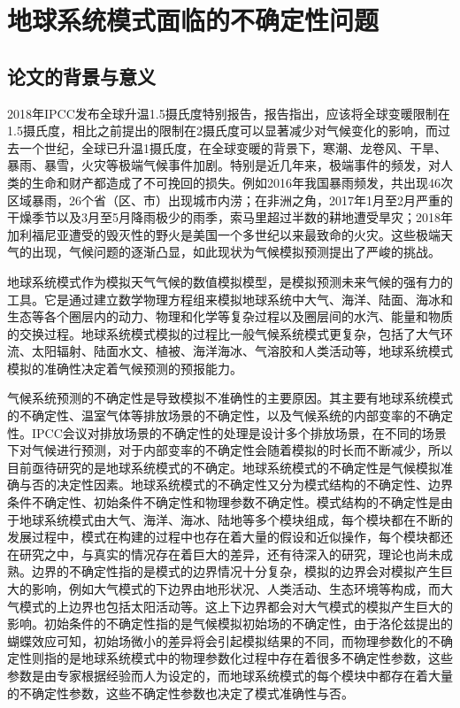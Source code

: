 \chapter{地球系统模式面临的不确定性问题}
\label{cha:intro}

\section{论文的背景与意义}
2018年IPCC发布全球升温1.5摄氏度特别报告，报告指出，应该将全球变暖限制在1.5摄氏度，相比之前提出的限制在2摄氏度可以显著减少对气候变化的影响，而过去一个世纪，全球已升温1摄氏度，在全球变暖的背景下，寒潮、龙卷风、干旱、暴雨、暴雪，火灾等极端气候事件加剧。特别是近几年来，极端事件的频发，对人类的生命和财产都造成了不可挽回的损失。例如2016年我国暴雨频发，共出现46次区域暴雨，26个省（区、市）出现城市内涝；在非洲之角，2017年1月至2月严重的干燥季节以及3月至5月降雨极少的雨季，索马里超过半数的耕地遭受旱灾；2018年加利福尼亚遭受的毁灭性的野火是美国一个多世纪以来最致命的火灾。这些极端天气的出现，气候问题的逐渐凸显，如此现状为气候模拟预测提出了严峻的挑战。

地球系统模式作为模拟天气气候的数值模拟模型，是模拟预测未来气候的强有力的工具。它是通过建立数学物理方程组来模拟地球系统中大气、海洋、陆面、海冰和生态等各个圈层内的动力、物理和化学等复杂过程以及圈层间的水汽、能量和物质的交换过程。地球系统模式模拟的过程比一般气候系统模式更复杂，包括了大气环流、太阳辐射、陆面水文、植被、海洋海冰、气溶胶和人类活动等，地球系统模式模拟的准确性决定着气候预测的预报能力。

气候系统预测的不确定性是导致模拟不准确性的主要原因。其主要有地球系统模式的不确定性、温室气体等排放场景的不确定性，以及气候系统的内部变率的不确定性。IPCC会议对排放场景的不确定性的处理是设计多个排放场景，在不同的场景下对气候进行预测，对于内部变率的不确定性会随着模拟的时长而不断减少，所以目前亟待研究的是地球系统模式的不确定。地球系统模式的不确定性是气候模拟准确与否的决定性因素。地球系统模式的不确定性又分为模式结构的不确定性、边界条件不确定性、初始条件不确定性和物理参数不确定性。模式结构的不确定性是由于地球系统模式由大气、海洋、海冰、陆地等多个模块组成，每个模块都在不断的发展过程中，模式在构建的过程中也存在着大量的假设和近似操作，每个模块都还在研究之中，与真实的情况存在着巨大的差异，还有待深入的研究，理论也尚未成熟。边界的不确定性指的是模式的边界情况十分复杂，模拟的边界会对模拟产生巨大的影响，例如大气模式的下边界由地形状况、人类活动、生态环境等构成，而大气模式的上边界也包括太阳活动等。这上下边界都会对大气模式的模拟产生巨大的影响。初始条件的不确定性指的是气候模拟初始场的不确定性，由于洛伦兹提出的蝴蝶效应可知，初始场微小的差异将会引起模拟结果的不同，而物理参数化的不确定性则指的是地球系统模式中的物理参数化过程中存在着很多不确定性参数，这些参数是由专家根据经验而人为设定的，而地球系统模式的每个模块中都存在着大量的不确定性参数，这些不确定性参数也决定了模式准确性与否。

